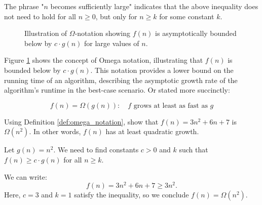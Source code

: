 The phrase "$n$ becomes sufficiently large" indicates that the above inequality does not need to hold for all $n \geq 0$, but only for $n \geq k$ for some constant $k$. 

\begin{figure}[htbp]
    \centering
    \caption{Illustration of \(\Omega\)-notation showing $f(n)$ is asymptotically bounded below by $c \cdot g(n)$ for large values of $n$.}
    \label{fig:omega_notation}
\end{figure}

Figure \ref{fig:omega_notation} shows the concept of Omega notation, illustrating that $f(n)$ is bounded below by $c \cdot g(n)$. This notation provides a lower bound on the running time of an algorithm, describing the asymptotic growth rate of the algorithm's runtime in the best-case scenario. Or stated more succinctly:

\[
f(n)=\Omega(g(n)): \quad f \text{ grows at least as fast as } g
\]


\begin{example}
    Using Definition \ref{def:omega_notation}, show that $f(n)=3n^2+6n+7$ is $\Omega(n^2)$. In other words, $f(n)$ has at least quadratic growth.
\end{example}

\begin{solution}
    Let $g(n) = n^2$. We need to find constants $c > 0$ and $k$ such that $f(n) \geq c \cdot g(n)$ for all $n \geq k$.

    We can write:
    \[
    f(n) = 3n^2 + 6n + 7 \geq 3n^2.
    \]
    Here, $c = 3$ and $k = 1$ satisfy the inequality, so we conclude $f(n) = \Omega(n^2)$.
\end{solution}

